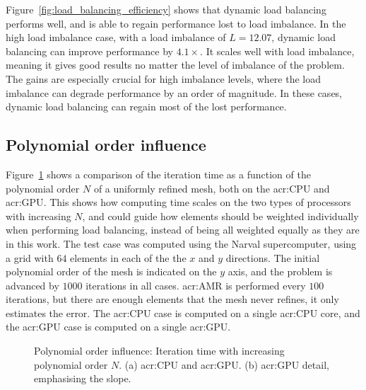 Figure~\ref{fig:load_balancing_efficiency} shows that dynamic load balancing performs well, and is
able to regain performance lost to load imbalance. In the high load imbalance case, with a load
imbalance of \(L = 12.07\), dynamic load balancing can improve performance by \(4.1 \times \). It
scales well with load imbalance, meaning it gives good results no matter the level of imbalance of
the problem. The gains are especially crucial for high imbalance levels, where the load imbalance
can degrade performance by an order of magnitude. In these cases, dynamic load balancing can regain
most of the lost performance.

\subsection{Polynomial order influence}\label{subsection:results:load_balancing_performance:polynomial_order}

Figure~\ref{fig:N_influence} shows a comparison of the iteration time as a function of the
polynomial order \(N\) of a uniformly refined mesh, both on the \acrshort{acr:CPU} and
\acrshort{acr:GPU}. This shows how computing time scales on the two types of processors with
increasing \(N\), and could guide how elements should be weighted individually when performing load
balancing, instead of being all weighted equally as they are in this work. The test case was
computed using the Narval supercomputer, using a grid with \(64\) elements in each of the the \(x\)
and \(y\) directions. The initial polynomial order of the mesh is indicated on the \(y\) axis, and
the problem is advanced by \(1000\) iterations in all cases. \Acrshort{acr:AMR} is performed every
\(100\) iterations, but there are enough elements that the mesh never refines, it only estimates the
error. The \acrshort{acr:CPU} case is computed on a single \acrshort{acr:CPU} core, and the
\acrshort{acr:GPU} case is computed on a single \acrshort{acr:GPU}.

\begin{figure}[H]
    \centering
    \hfill
    \caption{Polynomial order influence: Iteration time with increasing polynomial order \(N\). (a)
        \Acrshort{acr:CPU} and \Acrshort{acr:GPU}. (b) \Acrshort{acr:GPU} detail, emphasising the 
        slope.}\label{fig:N_influence}
\end{figure}

